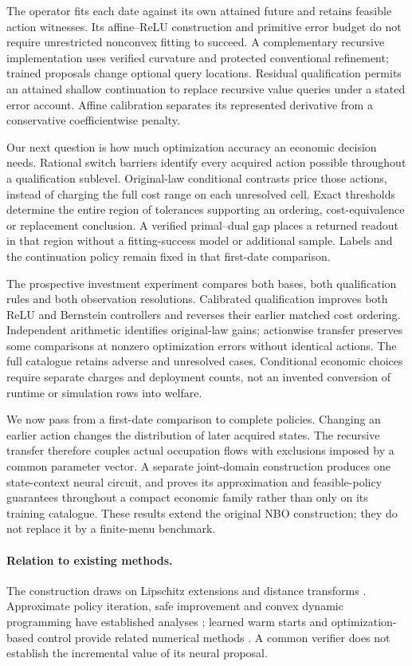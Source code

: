 \documentclass[ecta,nameyear,draft]{econsocart}
\begin{document}
The operator fits each date against its own attained future and retains feasible action witnesses. Its affine--ReLU construction and primitive error budget do not require unrestricted nonconvex fitting to succeed. A complementary recursive implementation uses verified curvature and protected conventional refinement; trained proposals change optional query locations. Residual qualification permits an attained shallow continuation to replace recursive value queries under a stated error account. Affine calibration separates its represented derivative from a conservative coefficientwise penalty.

Our next question is how much optimization accuracy an economic decision needs. Rational switch barriers identify every acquired action possible throughout a qualification sublevel. Original-law conditional contrasts price those actions, instead of charging the full cost range on each unresolved cell. Exact thresholds determine the entire region of tolerances supporting an ordering, cost-equivalence or replacement conclusion. A verified primal--dual gap places a returned readout in that region without a fitting-success model or additional sample. Labels and the continuation policy remain fixed in that first-date comparison.

The prospective investment experiment compares both bases, both qualification rules and both observation resolutions. Calibrated qualification improves both ReLU and Bernstein controllers and reverses their earlier matched cost ordering. Independent arithmetic identifies original-law gains; actionwise transfer preserves some comparisons at nonzero optimization errors without identical actions. The full catalogue retains adverse and unresolved cases. Conditional economic choices require separate charges and deployment counts, not an invented conversion of runtime or simulation rows into welfare.

We now pass from a first-date comparison to complete policies. Changing an earlier action changes the distribution of later acquired states. The recursive transfer therefore couples actual occupation flows with exclusions imposed by a common parameter vector. A separate joint-domain construction produces one state-context neural circuit, and proves its approximation and feasible-policy guarantees throughout a compact economic family rather than only on its training catalogue. These results extend the original NBO construction; they do not replace it by a finite-menu benchmark.

\paragraph{Relation to existing methods.}
The construction draws on Lipschitz extensions and distance transforms \citep{mcshane1934,felzenszwalb2012}. Approximate policy iteration, safe improvement and convex dynamic programming have established analyses \citep{munos2003,pirotta2013,scherrer2015,yang2020convex}; learned warm starts and optimization-based control provide related numerical methods \citep{sakaue2023warm,sambharya2023,agrawal2020control}. A common verifier does not establish the incremental value of its neural proposal.
\end{document}
